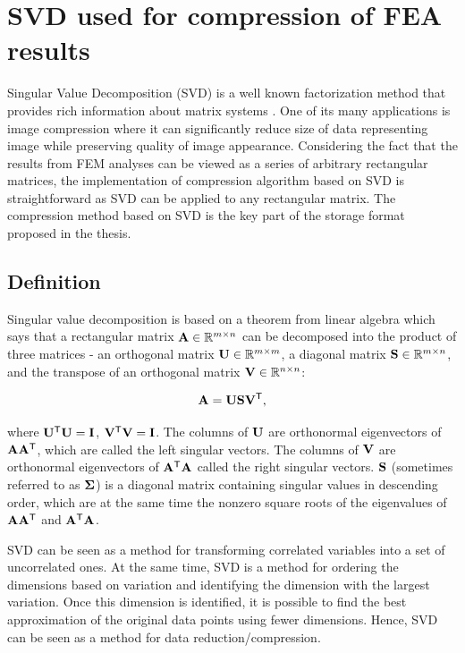 \chapter{SVD used for compression of FEA results}

Singular Value Decomposition (SVD) is a well known factorization method that provides rich information about matrix systems \cite{Golub1996, Kalman1996, Duintjer2012}. One of its many applications is image compression where it can significantly reduce size of data representing image while preserving quality of image appearance. Considering the fact that the results from FEM analyses can be viewed as a series of arbitrary rectangular matrices, the implementation of compression algorithm based on SVD is straightforward as SVD can be applied to any rectangular matrix. The compression method based on SVD is the key part of the storage format proposed in the thesis.


\section{Definition}

Singular value decomposition is based on a theorem from linear algebra which says that a rectangular matrix $\mathbf{A} \in \mathbb{R}^{m \times n}$ can be decomposed into the product of three matrices - an orthogonal matrix $\mathbf{U} \in \mathbb{R}^{m \times m}$, a diagonal
matrix $\mathbf{S} \in \mathbb{R}^{m \times n}$, and the transpose of an orthogonal matrix $\mathbf{V} \in \mathbb{R}^{n \times n}$:

\begin{equation}
\mathbf{A} = \mathbf{U} \mathbf{S} \mathbf{V}^\mathsf{T},
\label{eq:svd-def}
\end{equation}

\noindent
where $\mathbf{U^\mathsf{T}U} = \mathbf{I}$, $\mathbf{V^\mathsf{T}V} = \mathbf{I}$. The columns of $\mathbf{U}$ are orthonormal eigenvectors of $\mathbf{AA^\mathsf{T}}$, which are called the left singular vectors. The columns of $\mathbf{V}$ are orthonormal eigenvectors of $\mathbf{A^\mathsf{T}A}$ called the right singular vectors. $\mathbf{S}$ (sometimes referred to as $\mathbf{\Sigma}$) is a diagonal matrix containing singular values in descending order, which are at the same time the nonzero square roots of the eigenvalues of $\mathbf{AA^\mathsf{T}}$ and $\mathbf{A^\mathsf{T}A}$.

SVD can be seen as a method for transforming correlated variables into a set of uncorrelated ones. At the same time, SVD is a method for ordering the dimensions based on variation and identifying the dimension with the largest variation. Once this dimension is identified, it is possible to find the best approximation of the original data points using fewer dimensions. Hence, SVD can be seen as a method for data reduction/compression.

